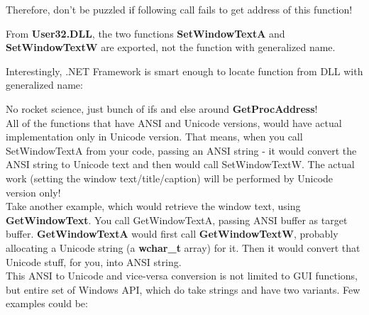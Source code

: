 	Therefore, don't be puzzled if following call fails to get address of this function!\\
	
	
	From \textbf{User32.DLL}, the two functions \textbf{SetWindowTextA} and \textbf{SetWindowTextW} are exported, not the function with generalized name.
	
	Interestingly, .NET Framework is smart enough to locate function from DLL with generalized name:\\
	
	
	No rocket science, just bunch of ifs and else around \textbf{GetProcAddress}!\\
	
	All of the functions that have ANSI and Unicode versions, would have actual implementation only in Unicode version. That means, when you call SetWindowTextA from your code, passing an ANSI string - it would convert the ANSI string to Unicode text and then would call SetWindowTextW. The actual work (setting the window text/title/caption) will be performed by Unicode version only!\\
	
	Take another example, which would retrieve the window text, using \textbf{GetWindowText}. You call GetWindowTextA, passing ANSI buffer as target buffer. \textbf{GetWindowTextA} would first call \textbf{GetWindowTextW}, probably allocating a Unicode string (a \textbf{wchar\_t} array) for it. Then it would convert that Unicode stuff, for you, into ANSI string.\\
	
	This ANSI to Unicode and vice-versa conversion is not limited to GUI functions, but entire set of Windows API, which do take strings and have two variants. Few examples could be:\\
	
